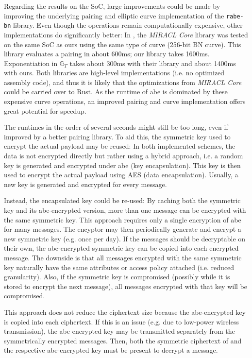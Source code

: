 Regarding the results on the SoC, large improvements could be made by improving the underlying pairing and elliptic curve implementation of the \texttt{rabe-bn} library.
Even though the operations remain computationally expensive, other implementations do significantly better:
In \cite{scott_deployment_2020}, the \emph{MIRACL Core} library was tested on the same SoC as ours using the same type of curve (256-bit BN curve).
This library evaluates a pairing in about 600ms; our library takes 1600ms. 
Exponentiation in $\mathbb{G}_T$ takes about 300ms with their library and about 1400ms with ours. 
Both libraries are high-level implementations (i.e. no optimized assembly code), and thus it is likely that the optimizations from \emph{MIRACL Core} could be carried over to Rust.
As the runtime of \acrshort{abe} is dominated by these expensive curve operations, an improved pairing and curve implementation offers great potential for speedup.

The runtimes in the order of several seconds might still be too long, even if improved by a better pairing library.
To aid this, the symmetric key used to encrypt the actual payload may be reused:
In both implemented schemes, the data is not encrypted directly but rather using a hybrid approach, i.e. a random key is generated and encrypted under \acrshort{abe} (key encapsulation).
This key is then used to encrypt the actual payload using AES (data encapsulation).
Usually, a new key is generated and encrypted for every message.

Instead, the encapsulated key could be re-used:
By caching both the symmetric key and its \acrshort{abe}-encrypted version, more than one message can be encrypted with the same symmetric key.
This approach requires only a single encryption of \acrshort{abe} for many messages.
The encyptor may then periodically generate and encrypt a new symmetric key (e.g. once per day).
If the messages should be decryptable on their own, the \acrshort{abe}-encrypted symmetric key can be copied into each encrypted message.
The downside is that all messages encrypted with the same symmetric key naturally have the same attributes or access policy attached (i.e. reduced granularity).
Also, if the symmetric key is compromised (possibly while it is stored to encrypt the next message), all messages encrypted with that key will be compromised.

This approach does not reduce the ciphertext size because the \acrshort{abe}-encrypted key is copied into each ciphertext.
If this is an issue (e.g. due to low-power wireless transmission), the \acrshort{abe}-encrypted key may be transmitted separately from the symmetrically encrypted messages.
Then, both the symmetric ciphertext of and the respective \acrshort{abe}-encrypted key must be present to decrypt a message.

